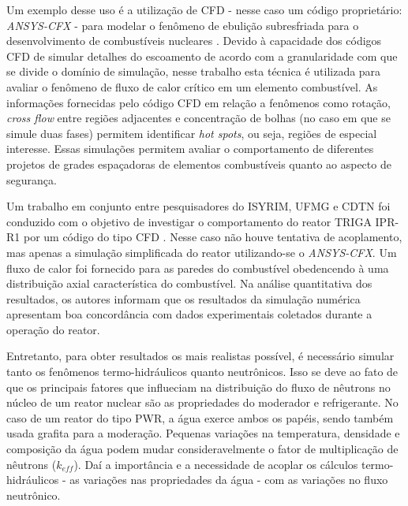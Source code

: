 Um exemplo desse uso é a utilização de CFD - nesse caso um código proprietário: 
\textit{ANSYS-CFX} - para modelar o fenômeno de ebulição subresfriada para o 
desenvolvimento de combustíveis nucleares \cite{Krepper2007}. Devido à capacidade 
dos códigos CFD de simular detalhes do escoamento de acordo com a granularidade com que se
divide o domínio de simulação, nesse trabalho esta técnica é utilizada para avaliar 
o fenômeno de fluxo de calor crítico em um elemento combustível. As informações 
fornecidas pelo código CFD em relação a fenômenos como rotação, \textit{cross flow} entre 
regiões adjacentes e concentração de bolhas (no caso em que se simule duas fases)
permitem identificar \textit{hot spots}, ou seja, regiões de especial interesse.
Essas simulações permitem avaliar o comportamento
de diferentes projetos de grades espaçadoras de elementos combustíveis quanto ao aspecto 
de segurança.

Um trabalho em conjunto entre pesquisadores do ISYRIM, UFMG e CDTN foi conduzido
com o objetivo de investigar o comportamento do reator TRIGA IPR-R1 por um código do tipo CFD \cite{Martinez2012}. 
Nesse caso não houve tentativa de acoplamento, mas apenas a simulação simplificada 
do reator utilizando-se o \textit{ANSYS-CFX}. Um fluxo de calor 
foi fornecido para as paredes do combustível obedencendo à uma distribuição axial 
característica do combustível. Na análise quantitativa dos resultados, os autores 
informam que os resultados da simulação numérica apresentam boa concordância com 
dados experimentais coletados durante a operação do reator.


Entretanto, para obter resultados os mais realistas possível, é necessário simular 
tanto os fenômenos termo-hidráulicos quanto neutrônicos. Isso 
se deve ao fato de que os principais fatores que influeciam na distribuição do fluxo de 
nêutrons no núcleo de um reator nuclear são as propriedades do moderador e refrigerante. No caso de um
reator do tipo PWR, a água exerce ambos os papéis, sendo também usada grafita para 
a moderação. Pequenas variações na temperatura, densidade e composição 
da água podem mudar consideravelmente o fator de multiplicação de nêutrons ($k_{eff}$). Daí a importância e 
a necessidade de acoplar os cálculos termo-hidráulicos - as variações nas propriedades da água - com as variações 
no fluxo neutrônico.

